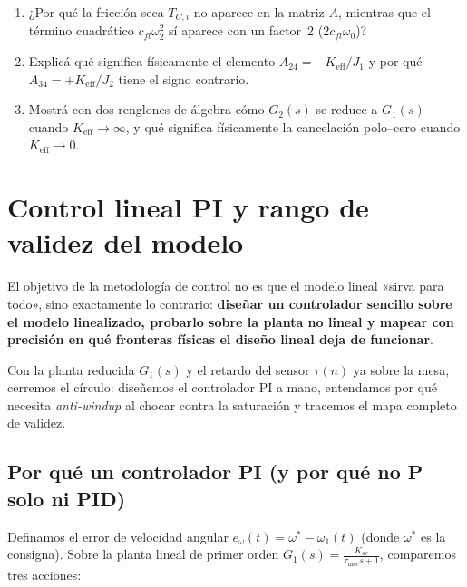\documentclass[11pt,a4paper,oneside]{book}
\begin{document}
\begin{lapizypapel}
\begin{enumerate}[leftmargin=1.5em]
  \item ¿Por qué la fricción seca $T_{C,i}$ no aparece en la matriz $A$, mientras
        que el término cuadrático $c_{fl}\omega_2^2$ sí aparece con un factor~2
        ($2c_{fl}\omega_0$)?
  \item Explicá qué significa físicamente el elemento $A_{24} = -K_{\text{eff}}/J_1$
        y por qué $A_{34} = +K_{\text{eff}}/J_2$ tiene el signo contrario.
  \item Mostrá con dos renglones de álgebra cómo $G_2(s)$ se reduce a $G_1(s)$
        cuando $K_{\text{eff}} \to \infty$, y qué significa físicamente la
        cancelación polo--cero cuando $K_{\text{eff}} \to 0$.
\end{enumerate}
\end{lapizypapel}

\chapter{Control lineal PI y rango de validez del modelo}\label{cap:control_validez}

\begin{ideafisica}
El objetivo de la metodología de control no es que el modelo lineal «sirva para
todo», sino exactamente lo contrario: \textbf{diseñar un controlador sencillo
sobre el modelo linealizado, probarlo sobre la planta no lineal y mapear con
precisión en qué fronteras físicas el diseño lineal deja de funcionar}.
\end{ideafisica}

Con la planta reducida $G_1(s)$ y el retardo del sensor $\tau(n)$ ya sobre la
mesa, cerremos el círculo: diseñemos el controlador PI a mano, entendamos por
qué necesita \emph{anti-windup} al chocar contra la saturación y tracemos el
mapa completo de validez.

\section{Por qué un controlador PI (y por qué no P solo ni PID)}

Definamos el error de velocidad angular $e_\omega(t) = \omega^\ast - \omega_1(t)$
(donde $\omega^\ast$ es la consigna). Sobre la planta lineal de primer orden
$G_1(s) = \frac{K_{dc}}{\tau_{\text{mec}}s + 1}$, comparemos tres acciones:
\end{document}
